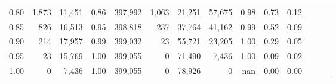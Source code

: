 \begin{tabular}{rrrrrrrrrrrrrr}
0.80 &   1,873 &  11,451 &  0.86 &  397,992 &    1,063 &  21,251 &  57,675 &  0.98 &  0.73 &      0.12 \\
0.85 &     826 &  16,513 &  0.95 &  398,818 &      237 &  37,764 &  41,162 &  0.99 &  0.52 &      0.09 \\
0.90 &     214 &  17,957 &  0.99 &  399,032 &       23 &  55,721 &  23,205 &  1.00 &  0.29 &      0.05 \\
0.95 &      23 &  15,769 &  1.00 &  399,055 &        0 &  71,490 &   7,436 &  1.00 &  0.09 &      0.02 \\
1.00 &       0 &   7,436 &  1.00 &  399,055 &        0 &  78,926 &       0 &   nan &  0.00 &      0.00 \\
\bottomrule
\end{tabular}
